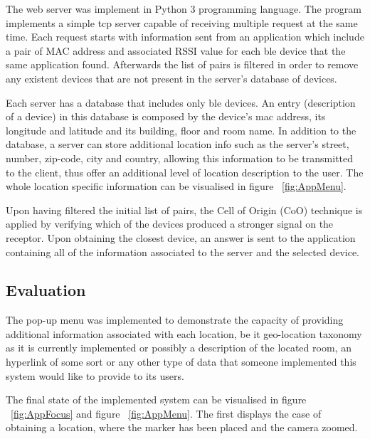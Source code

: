 \documentclass[a4paper]{IEEEtran}
\begin{document}
 
The web server was implement in Python 3 programming language. The program implements a simple tcp server capable of receiving multiple request at the same time. Each request starts with information sent from an application which include a pair of MAC address and associated RSSI value for each ble device that the same application found. Afterwards the list of pairs is filtered in order to remove any existent devices that are not present in the server's database of devices. 
 
 
Each server has a database that includes only ble devices. An entry (description of a device) in this database is composed by the device's mac address, its longitude and latitude and its building, floor and room name. In addition to the database, a server can store additional location info such as the server's street, number, zip-code, city and country, allowing this information to be transmitted to the client, thus offer an additional level of location description to the user. The whole location specific information can be visualised in figure ~\ref{fig:AppMenu}. 
 
 
Upon having filtered the initial list of pairs, the Cell of Origin (CoO) technique is applied by verifying which of the devices produced a stronger signal on the receptor. Upon obtaining the closest device, an answer is sent to the application containing all of the information associated to the server and the selected device. 
 
 
\subsection{Evaluation} 
\label{sec:eval} 
 
The pop-up menu was implemented to demonstrate the capacity of providing additional information associated with each location, be it geo-location taxonomy as it is currently implemented or possibly a description of the located room, an hyperlink of some sort or any other type of data that someone implemented this system would like to provide to its users.   
 
 
The final state of the implemented system can be visualised in figure ~\ref{fig:AppFocus} and figure ~\ref{fig:AppMenu}. The first displays the case of obtaining a location, where the marker has been placed and the camera zoomed. 
 
\end{document}
